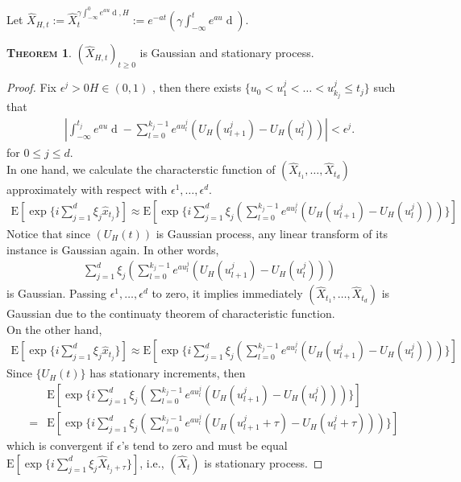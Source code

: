 \documentclass[a4paper, twoside, 11pt]{article}
\theoremstyle{definition}
\newtheorem{theorem}[definition]{\scshape Theorem}
\newcommand{\brkt}[1]{\left({#1} \right)}
\begin{document}
Let $\hat{X}_{H,t}:= \hat{X}_t^{\gamma\int_{-\infty}^0 e^{au}\mathop{dU_H(u)}, H} := e^{-at}\brkt{\gamma\int_{-\infty}^t e^{au}\mathop{dU_H(u)}}$.
\begin{theorem}
  $(\hat{X}_{H,t})_{t\ge 0}$ is Gaussian and stationary process.
  \label{sec:gsp}
\end{theorem}

\begin{proof}
  Fix $\epsilon^j > 0 H\in (0,1)$ , then there exists  $\{u_0<u_1^j<\dots<u^j_{k_j}\le t_j\}$ such that
  \begin{eqnarray*}
	|\int_{-\infty}^{t_j} e^{au}\mathop{dU_H(u)} - \sum_{l=0}^{k_j-1} e^{au^j_l}(U_H(u^j_{l+1}) - U_H(u^j_{l}))| < \epsilon^j.
  \end{eqnarray*}
  for $0 \le j \le d $.\\
  In one hand, we calculate the characterstic function of $(\hat{X}_{t_1},\dots, \hat{X}_{t_d})$ approximately with respect with $\epsilon^1,\dots,\epsilon^d$.
  \begin{eqnarray*}
	\mathrm{E}[\exp\{i\sum_{j=1}^d \xi_j\hat{x}_{t_j}\}] \approx \mathrm{E}[\exp\{ i\sum_{j=1}^d \xi_j\brkt{\sum_{l=0}^{k_j-1} e^{au^j_l}(U_H(u^j_{l+1}) - U_H(u^j_{l})) }\}]
  \end{eqnarray*}
  Notice that since $(U_H(t))$ is Gaussian process, any linear transform of its instance is Gaussian again. In other words, 
  \begin{eqnarray*}
	\sum_{j=1}^d \xi_j \brkt{\sum_{l=0}^{k_j-1} e^{au^j_l}(U_H(u^j_{l+1}) - U_H(u^j_{l})) }
  \end{eqnarray*}
  is Gaussian. Passing $\epsilon^1,\dots,\epsilon^d$ to zero, it implies immediately $(\hat{X}_{t_1},\dots, \hat{X}_{t_d})$ is Gaussian due to the continuaty theorem of characteristic function.\\
  On the other hand,
	\begin{eqnarray*}
	\mathrm{E}[\exp\{i\sum_{j=1}^d \xi_j\hat{x}_{t_j }\}] \approx \mathrm{E}[\exp\{ i\sum_{j=1}^d \xi_j\brkt{\sum_{l=0}^{k_j-1} e^{au^j_l}(U_H(u^j_{l+1}) - U_H(u^j_{l})) }\}]
  \end{eqnarray*}
  Since $\{U_H(t)\}$ has stationary increments, then 
  \begin{eqnarray*}
	&& \mathrm{E}[\exp\{ i\sum_{j=1}^d \xi_j\brkt{\sum_{l=0}^{k_j-1} e^{au^j_l}(U_H(u^j_{l+1}) - U_H(u^j_{l})) }\}] \\
	&=& \mathrm{E}[\exp\{ i\sum_{j=1}^d \xi_j\brkt{\sum_{l=0}^{k_j-1} e^{au^j_l}(U_H(u^j_{l+1}+\tau) - U_H(u^j_{l}+\tau)) }\}]
  \end{eqnarray*}
  which is convergent if $\epsilon$'s tend to zero and must be equal $\mathrm{E}[\exp\{ i\sum_{j=1}^d \xi_j \hat{X}_{t_j+\tau}\}]$, i.e., $(\hat{X}_t)$ is stationary process.
\end{proof}
\end{document}
